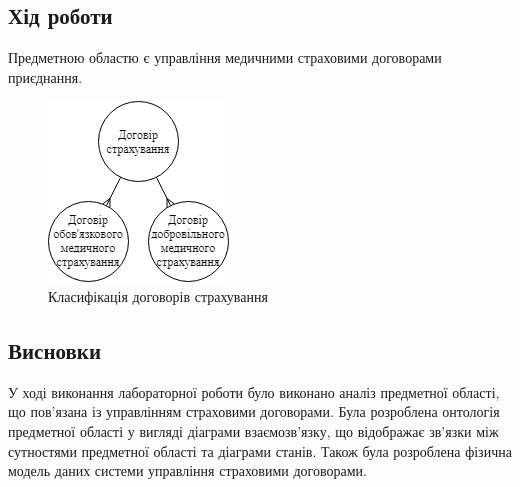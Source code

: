 \subsection*{Хід роботи}
Предметною областю є управління медичними страховими договорами приєднання.

\begin{figure}[H]
    \centering
        \includegraphics{idef_classification}
    \caption{Класифікація договорів страхування}
    \label{fig:idef_classification}
\end{figure}

\subsection*{Висновки}
У ході виконання лабораторної роботи було виконано аналіз предметної області, що пов'язана із управлінням страховими договорами. Була розроблена онтологія предметної області у вигляді діаграми взаємозв'язку, що відображає зв'язки між сутностями предметної області та діаграми станів. Також була розроблена фізична модель даних системи управління страховими договорами.


